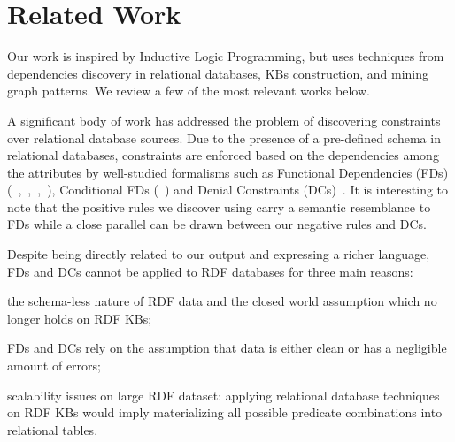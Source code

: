 \section{Related Work} \label{sec:krd_related}

Our work is inspired by Inductive Logic Programming, but uses techniques from dependencies discovery in relational databases, KBs construction, and mining graph patterns. 
We review a few of the most relevant works below.

A significant body of work has addressed the problem of discovering constraints over relational database sources. 
Due to the presence of a pre-defined schema in relational databases, constraints are enforced based on the dependencies among the attributes by well-studied formalisms such as 
Functional Dependencies (FDs)(~\cite{abiteboul1995foundations},~\cite{abedjan2014dfd},~\cite{huhtala1999tane},~\cite{wyss2001fastfds}), Conditional FDs (~\cite{fan2011discovering}) 
and Denial Constraints (DCs)~\cite{bertossi2011database,chu2013holistic}. It is interesting to note that the positive rules we discover using \krd carry 
a semantic resemblance to FDs while 
a close parallel can be drawn between our negative rules and DCs.
%

Despite being directly related to our output and expressing a richer language, FDs and DCs cannot be applied to RDF databases for three main reasons:
\begin{inparaenum}[\itshape(i)]
	\item the schema-less nature of RDF data and the closed world assumption which no longer holds on RDF KBs;
	\item FDs and DCs rely on the assumption that data is either clean or has a negligible amount of errors;
	\item scalability issues on large RDF dataset: applying relational database techniques on RDF KBs would imply materializing all possible predicate combinations into relational tables.
\end{inparaenum}

